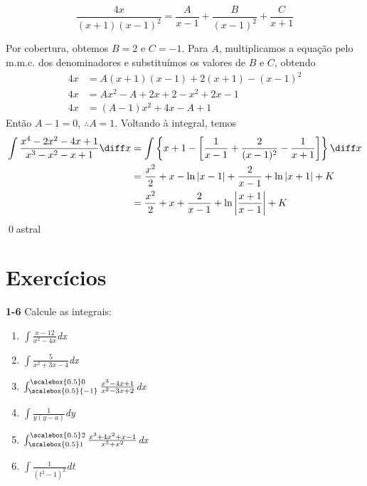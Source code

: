 \documentclass[a4paper, 12pt]{extreport}
\begin{document}
        $$ \frac{4x}{(x+1)(x-1)^2} = \frac{A}{x-1} + \frac{B}{(x-1)^2} + \frac{C}{x+1} $$

        \vspace{3mm}
        \noindent Por cobertura, obtemos $B=2$ e $C=-1$. Para $A$, multiplicamos a equação pelo m.m.c. dos denominadores e substituímos os
        valores de $B$ e $C$, obtendo
        \begin{equation*}
          \begin{split}
            4x & = A(x+1)(x-1) + 2(x+1) - (x-1)^2 \\
            4x & = Ax^2-A + 2x+2 - x^2+2x-1 \\
            4x & = (A-1)x^2 + 4x - A + 1
          \end{split}
        \end{equation*}
        Então $A-1 = 0$, $\therefore A = 1$. Voltando à integral, temos
        \begin{equation*}
          \begin{split}
            \int{\frac{x^4-2x^2-4x+1}{x^3-x^2-x+1}\diff x} & = \int{\left\{x+1-\left[\frac{1}{x-1} + \frac{2}{(x-1)^2} - \frac{1}{x+1}\right]\right\}\diff x} \\
                                                      & = \frac{x^2}{2}+x-\ln|x-1|+\frac{2}{x-1}+\ln|x+1| + K \\
                                                      & = \frac{x^2}{2}+x+\frac{2}{x-1}+\ln\left|\frac{x+1}{x-1}\right| + K
          \end{split}
        \end{equation*}
        \qed{astral}

    \section{Exercícios}
      {\color{astral}\textbf{1-6}} Calcule as integrais:
      \begin{multicols}{3}
        \begin{enumerate}
          \item \Large$\int{\frac{x-12}{x^2-4x}}$\normalsize\textit{dx}
          \item \Large$\int{\frac{5}{x^2+3x-4}}$\normalsize\textit{dx}
          \item \Large$\int_{\scalebox{0.5}{-1}}^{\scalebox{0.5}0}{\frac{x^3-4x+1}{x^2-3x+2}}$\normalsize\textit{dx}
          \item \Large$\int{\frac{1}{y(y-a)}}$\normalsize\textit{dy}
          \item \Large$\int_{\scalebox{0.5}1}^{\scalebox{0.5}2}{\frac{x^3+4x^2+x-1}{x^3+x^2}}$\normalsize\textit{dx}
          \item \Large$\int{\frac{1}{(t^2-1)^2}}$\normalsize\textit{dt}
        \end{enumerate}
      \end{multicols}
\end{document}
